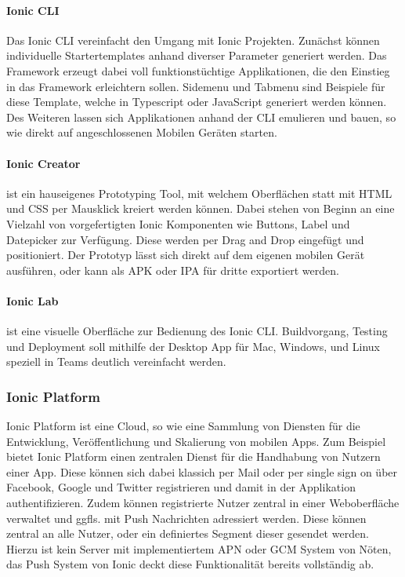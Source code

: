 \paragraph{Ionic \ac{CLI}}
Das Ionic \ac{CLI} vereinfacht den Umgang mit Ionic Projekten. Zunächst können individuelle
Startertemplates anhand diverser Parameter generiert werden.
Das Framework erzeugt dabei voll funktionstüchtige Applikationen, die den Einstieg in das Framework erleichtern sollen.
Sidemenu und Tabmenu sind Beispiele für diese Template, welche in Typescript oder JavaScript generiert werden können.
Des Weiteren lassen sich Applikationen anhand der \ac{CLI} emulieren und bauen,
so wie direkt auf angeschlossenen Mobilen Geräten starten.

\paragraph{Ionic Creator}
ist ein hauseigenes Prototyping Tool, mit welchem Oberflächen statt
mit HTML und CSS per Mausklick kreiert werden können.
Dabei stehen von Beginn an eine Vielzahl von vorgefertigten Ionic Komponenten wie Buttons,
Label und Datepicker zur Verfügung.
Diese werden per Drag and Drop eingefügt und positioniert. Der Prototyp lässt sich direkt auf
dem eigenen mobilen Gerät ausführen, oder kann als \ac{APK} oder \ac{IPA} für dritte exportiert werden.

\paragraph{Ionic Lab}
ist eine visuelle Oberfläche zur Bedienung des Ionic \ac{CLI}.
Buildvorgang, Testing und Deployment soll mithilfe der Desktop App für Mac, Windows, und
Linux speziell in Teams deutlich vereinfacht werden. \cite{Ionic75:online}

\subsubsection{Ionic Platform}

Ionic Platform ist eine Cloud, so wie eine Sammlung von Diensten für die Entwicklung,
Veröffentlichung und Skalierung von mobilen Apps. Zum Beispiel bietet Ionic Platform einen zentralen Dienst für die Handhabung von Nutzern einer App.
Diese können sich dabei klassich per Mail oder per single sign on über
Facebook, Google und Twitter registrieren und damit in der Applikation authentifizieren.
Zudem können registrierte Nutzer zentral in einer Weboberfläche verwaltet und ggfls. mit Push Nachrichten adressiert werden.
Diese können zentral an alle Nutzer, oder ein definiertes Segment dieser gesendet werden.
Hierzu ist kein Server mit implementiertem \ac{APN} oder \ac{GCM} System von Nöten, das Push System von Ionic deckt diese
Funktionalität bereits vollständig ab.

